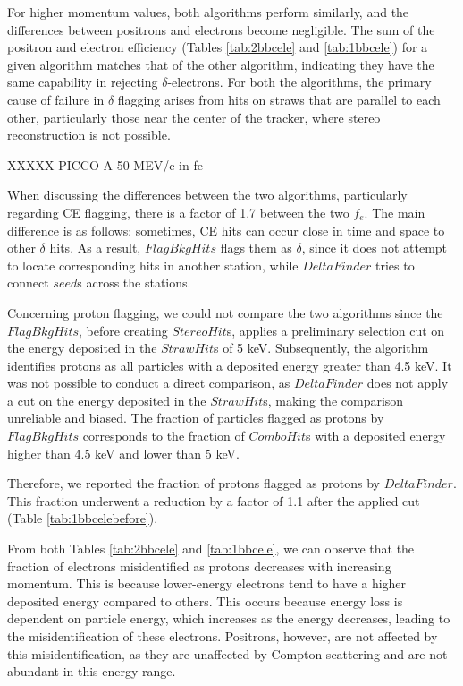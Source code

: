 For higher momentum values, both algorithms perform similarly, and 
the differences between positrons and electrons become negligible. 
The sum of the positron and electron efficiency (Tables \ref{tab:2bbcele} 
and \ref{tab:1bbcele}) for a given algorithm 
matches that of the other algorithm, indicating they have the same 
capability in rejecting $\delta$-electrons. 
For both the algorithms, the primary cause of failure 
in $\delta$ flagging arises from hits on straws that are 
parallel to each other, particularly those near the center of the tracker, 
where stereo reconstruction is not possible.

XXXXX PICCO A 50 MEV/c in fe

When discussing the differences between the two 
algorithms, particularly regarding CE flagging, 
there is a factor of 1.7 between the two $f_e$. 
The main difference is as follows: sometimes, CE hits 
can occur close in time and space to other $\delta$ hits. 
As a result, $FlagBkgHits$ flags them as $\delta$, since 
it does not attempt to locate corresponding hits in another station, 
while $DeltaFinder$ tries to connect $seed$s across the stations.


Concerning proton flagging, we could not compare the two 
algorithms since the $FlagBkgHits$, before creating $StereoHit$s, 
applies a preliminary selection cut on the energy deposited in 
the $StrawHit$s of 5 keV. Subsequently, the algorithm identifies 
protons as all particles with a deposited energy greater than 
4.5 keV. It was not possible to conduct a direct comparison, 
as $DeltaFinder$ does not apply a cut on the energy deposited in 
the $StrawHit$s, making the comparison unreliable and biased. 
The fraction of particles flagged as protons by $FlagBkgHits$ 
corresponds to the fraction of $ComboHit$s with a 
deposited energy higher than 4.5 keV and lower than 5 keV.

Therefore, we reported the fraction of protons 
flagged as protons by $DeltaFinder$.
This fraction underwent a reduction by a factor of 
1.1 after the applied cut (Table \ref{tab:1bbcelebefore}). 

From both Tables \ref{tab:2bbcele} and \ref{tab:1bbcele}, 
we can observe that the fraction of electrons misidentified 
as protons decreases with increasing momentum. This is because 
lower-energy electrons tend to have a higher deposited energy 
compared to others. This occurs because energy loss is dependent 
on particle energy, which increases as the energy decreases, 
leading to the misidentification of these electrons. Positrons, 
however, are not affected by this misidentification, as they 
are unaffected by Compton scattering and are not abundant in this energy range.

